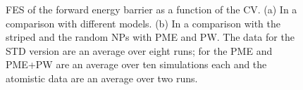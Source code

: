 \begin{figure}[pth]
	\centering
	\begin{adjustwidth}{-1.5cm}{-0.5cm}
		\caption{\acs{FES} of the forward energy barrier as a function of the \acs{CV}. (a) In a comparison with different models. (b) In a comparison with the striped and the random \acp{NP} with \acs{PME} and \acs{PW}. The data for the STD version are an average over eight runs; for the \acs{PME} and \acs{PME}+\acs{PW} are an average over ten simulations each and the atomistic data are an average over two runs.}%
		\label{fig:forwardWall}%
	
		\vspace*{\floatsep}%
	

\end{adjustwidth}
\end{figure}
